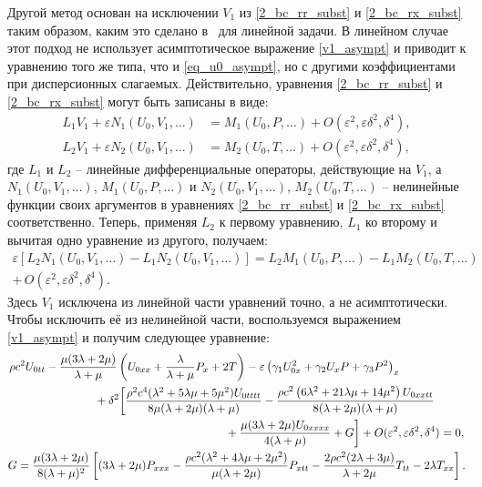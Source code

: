 \documentclass[12pt, a4paper]{report}
\begin{document}
Другой метод основан на исключении $V_1$ из \eqref{2_bc_rr_subst} и \eqref{2_bc_rx_subst} таким образом, каким это сделано в~\cite{bostrm2000} для линейной задачи. В линейном случае этот подход не использует асимптотическое выражение \eqref{v1_asympt} и приводит к уравнению того же типа, что и \eqref{eq_u0_asympt}, но с другими коэффициентами при дисперсионных слагаемых. Действительно, уравнения \eqref{2_bc_rr_subst} и \eqref{2_bc_rx_subst} могут быть записаны в виде:
\begin{align}%
L_{1} V_1 + \varepsilon N_1(U_0, V_1, \dots) &= M_1(U_0, P, \dots) + O(\varepsilon^2, \varepsilon\delta^2, \delta^4),\\
L_{2} V_1 + \varepsilon N_2(U_0, V_1, \dots) &= M_2(U_0, T, \dots) + O(\varepsilon^2, \varepsilon\delta^2, \delta^4),
\end{align}
где $L_{1}$ и $L_{2}$ -- линейные дифференциальные операторы, действующие на $V_1$, а $N_1(U_0, V_1, \dots)$, $M_1 (U_0, P, \dots)$ и $N_2(U_0, V_1, \dots)$, $M_2 (U_0, T, \dots)$ -- нелинейные функции своих аргументов в уравнениях \eqref{2_bc_rr_subst} и \eqref{2_bc_rx_subst} соответственно. Теперь, применяя $L_{2}$ к первому уравнению, $L_{1}$ ко второму и вычитая одно уравнение из другого, получаем:
\begin{equation}
\begin{split}
\varepsilon [L_{2}N_1(U_0, V_1, \dots) - L_{1}N_2(U_0, V_1, \dots)] = L_{2}M_1(U_0, P, \dots) - L_{1}M_2(U_0, T, \dots) \\
+\, O(\varepsilon^2, \varepsilon\delta^2, \delta^4).
\end{split}
\end{equation}
Здесь $V_1$ исключена из линейной части уравнений точно, а не асимптотически. Чтобы исключить её из нелинейной части, воспользуемся выражением \eqref{v1_asympt} и получим следующее уравнение:
\begin{gather} \label{eq_u0_bostr}
\begin{split}
\rho c^2 U_{0tt} &- \frac{\mu(3\lambda + 2\mu)}{\lambda + \mu} \left(U_{0xx} + \frac{\lambda}{\lambda + \mu} P_x + 2T\right)
- \varepsilon \left(\gamma_1 U_{0x}^2 + \gamma_2 U_x P + \gamma_3 P^2 \right)_x \\
&\hspace{15mm}+ \delta^2 \bigg[\frac{\rho ^2 c^4 (\lambda^2 + 5\lambda\mu + 5\mu^2) U_{0tttt}}{8\mu(\lambda+2\mu)(\lambda+\mu)} - \frac{\rho c^2 \left(6\lambda^2 + 21\lambda \mu + 14\mu^2\right) U_{0xxtt}}{8(\lambda + 2\mu)(\lambda + \mu)} \\
&\hspace{55mm} + \frac{\mu(3\lambda + 2\mu) U_{0xxxx}}{4(\lambda + \mu)} + G\bigg] + O(\varepsilon^2, \varepsilon\delta^2, \delta^4) = 0,
\end{split}\\
\nonumber
G  = \frac{\mu(3\lambda + 2\mu)}{8(\lambda + \mu)^2} \left[(3\lambda + 2\mu) P_{xxx} - \frac{\rho c^2(\lambda^2 + 4\lambda\mu + 2\mu^2)}{\mu(\lambda + 2\mu)} P_{xtt} - \frac{2\rho c^2 (2\lambda + 3\mu)}{\lambda + 2\mu} T_{tt} - 2\lambda T_{xx}\right]. 
\end{gather}
\end{document}
